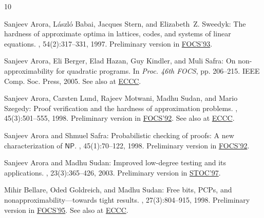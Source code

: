\tocrefpdfbookmark
\begin{thebibliography}{10}

{\sc Sanjeev Arora, L{\'a}szl{\'o} Babai, Jacques Stern, and Elizabeth~Z.
  Sweedyk}: The hardness of approximate optima in lattices, codes, and systems
  of linear equations.
, 54(2):317--331, 1997.
\newblock Preliminary version in
  \href{http://dx.doi.org/10.1109/SFCS.1993.366815}{FOCS'93}.

{\sc Sanjeev Arora, Eli Berger, Elad Hazan, Guy Kindler, and Muli Safra}: On
  non-approximability for quadratic programs.
\newblock In {\em Proc. 46th FOCS}, pp. 206--215. IEEE Comp. Soc. Press, 2005.
\newblock See also at \href{http://eccc.hpi-web.de/report/2005/058/}{ECCC}.

{\sc Sanjeev Arora, Carsten Lund, Rajeev Motwani, Madhu Sudan, and Mario
  Szegedy}: Proof verification and the hardness of approximation problems.
, 45(3):501--555, 1998.
\newblock Preliminary version in
  \href{http://dx.doi.org/10.1109/SFCS.1992.267823}{FOCS'92}. See also at
  \href{http://eccc.hpi-web.de/report/1998/008/}{ECCC}.
\newblock [\epfmtdoi{10.1145/278298.278306}]

{\sc Sanjeev Arora and Shmuel Safra}: Probabilistic checking of proofs: A new
  characterization of $\mathsf{NP}$.
, 45(1):70--122, 1998.
\newblock Preliminary version in
  \href{http://dx.doi.org/10.1109/SFCS.1992.267824}{FOCS'92}.
\newblock [\epfmtdoi{10.1145/273865.273901}]

{\sc Sanjeev Arora and Madhu Sudan}: Improved low-degree testing and its
  applications.
, 23(3):365--426, 2003.
\newblock Preliminary version in
  \href{http://dx.doi.org/10.1145/258533.258642}{STOC'97}.
\newblock [\epfmtdoi{10.1007/s00493-003-0025-0}]

{\sc Mihir Bellare, Oded Goldreich, and Madhu Sudan}: Free bits, {PCPs}, and
  nonapproximability---towards tight results.
, 27(3):804--915, 1998.
\newblock Preliminary version in
  \href{http://dx.doi.org/10.1109/SFCS.1995.492573}{FOCS'95}. See also at
  \href{http://eccc.hpi-web.de/report/1995/024/}{ECCC}.
\newblock [\epfmtdoi{10.1137/S0097539796302531}]


\end{thebibliography}
